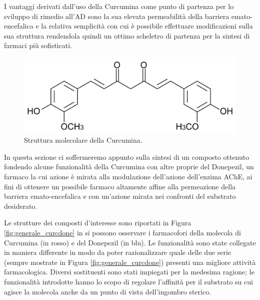\documentclass[a4paper, 12pt]{article}
\begin{document}
I vantaggi derivati dall'uso della Curcumina come punto di partenza per lo sviluppo di rimedio all'AD sono la sua elevata permeabilità della barriera emato-encefalica e la relativa semplicità con cui è possibile effettuare modificazioni sulla sua struttura rendendola quindi un ottimo scheletro di partenza per la sintesi di farmaci più sofisticati. \autocite{jabir_cholinesterase_2018, jiang_traditional_2017}

\begin{figure}[H]
	\centering
	\includegraphics[width=.6\linewidth]{immagini/curcumina.png}
	\caption{Struttura molecolare della Curcumina.}
	\label{fig:curcumina}
\end{figure}

In questa sezione ci soffermeremo appunto sulla sintesi di un composto ottenuto fondendo alcune funzionalità della Curcumina con altre proprie del Donepezil, un farmaco la cui azione è mirata alla modulazione dell'azione dell'enzima AChE, ai fini di ottenere un possibile farmaco altamente affine alla permeazione della barriera emato-encefalica e con un'azione mirata nei confronti del substrato desiderato.

Le strutture dei composti d'interesse sono riportati in Figura \ref{fig:generale_curcdone} in si possono osservare i farmacofori della molecola di Curcumina (in rosso) e del Donepezil (in blu). Le funzionalità sono state collegate in maniera differente in modo da poter razionalizzare quale delle due serie (sempre mostrate in Figura \ref{fig:generale_curcdone}) presenti una migliore attività farmacologica. Diversi sostituenti sono stati impiegati per la medesima ragione; le funzionalità introdotte hanno lo scopo di regolare l'affinità per il substrato su cui agisce la molecola anche da un punto di vista dell'ingombro sterico.
\end{document}
